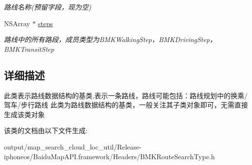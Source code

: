 \begin{DoxyCompactItemize}
\begin{DoxyCompactList}\small\item\em 路线名称(预留字段，现为空) \end{DoxyCompactList}\item 
\hypertarget{interface_b_m_k_route_line_a181c231815114b03dfc858ac26a0168a}{}N\+S\+Array $\ast$ \hyperlink{interface_b_m_k_route_line_a181c231815114b03dfc858ac26a0168a}{steps}\label{interface_b_m_k_route_line_a181c231815114b03dfc858ac26a0168a}

\begin{DoxyCompactList}\small\item\em 路线中的所有路段，成员类型为\+B\+M\+K\+Walking\+Step，\+B\+M\+K\+Driving\+Step，\+B\+M\+K\+Transit\+Step \end{DoxyCompactList}\end{DoxyCompactItemize}


\subsection{详细描述}
此类表示路线数据结构的基类,表示一条路线，路线可能包括：路线规划中的换乘/驾车/步行路线 此类为路线数据结构的基类，一般关注其子类对象即可，无需直接生成该类对象 

该类的文档由以下文件生成\+:\begin{DoxyCompactItemize}
\item 
output/map\+\_\+search\+\_\+cloud\+\_\+loc\+\_\+util/\+Release-\/iphoneos/\+Baidu\+Map\+A\+P\+I.\+framework/\+Headers/B\+M\+K\+Route\+Search\+Type.\+h\end{DoxyCompactItemize}
